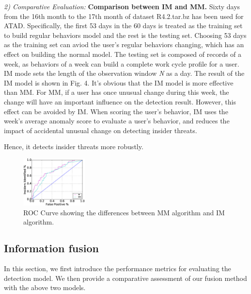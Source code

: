 \documentclass[conference]{IEEEtran}
\begin{document}

\emph{2) Comparative Evaluation:} 
\textbf{Comparison between IM and MM.}
Sixty days from the 16th month to the 17th month of dataset R4.2.tar.bz has been used for ATAD. Specifically, the first 53 days in the 60 days is treated as the training set to build regular behaviors model and the rest is the testing set. Choosing 53 days as the training set can aviod the user's regular behaviors changing, which has an effect on building the normal model. The testing set is composed of records of a week, as behaviors of a week can build a complete work cycle profile for a user. IM mode sets the length of the observation window \emph{N} as a day.
The result of the IM model is shown in Fig. 4. It's obvious that the IM model is more effective than MM. For MM, if a user has once unusual change during this week, the change will have an important influence on the detection result. However, this effect can be avoided by IM. When scoring the user's behavior, IM uses the week's average anomaly score to evaluate a user's behavior, and reduces the impact of accidental unusual change on detecting insider threats.

Hence, it detects insider threats more robustly. 



\begin{figure}[htb]
\centerline{\includegraphics[width = 0.30\textwidth]{figure/figure7.eps}}
\caption{ROC Curve showing the differences between MM algorithm and IM algorithm.}
\label{fig}
\end{figure}


\subsection{Information fusion}
In this section,  we first introduce the performance metrics for evaluating the detection model.
We then provide a comparative assessment of our fusion method with the above two models.
\end{document}
